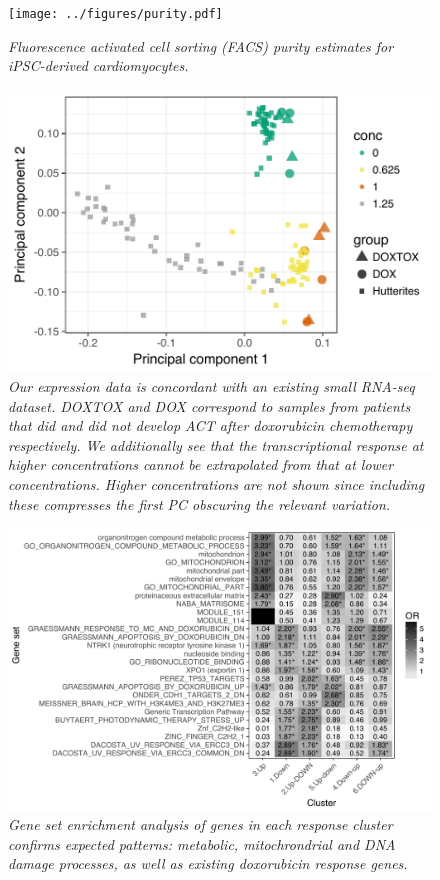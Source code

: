 \documentclass{article}
\begin{document}
\begin{figure}[h]
\begin{center}
    \texttt{[image: ../figures/purity.pdf]} 
    \caption{\it{Fluorescence activated cell sorting (FACS) purity estimates for iPSC-derived cardiomyocytes.}}
    \label{fig:purity}
    \end{center}
\end{figure}

\begin{figure}[h]
\begin{center}
    \includegraphics[width=.6\textwidth]{../figures/burridge_comparison.pdf} %
    \caption{\it{Our expression data is concordant with an existing small RNA-seq dataset\citep{Burridge2016}. DOXTOX and DOX correspond to samples from patients that did and did not develop ACT after doxorubicin chemotherapy respectively. We additionally see that the transcriptional response at higher concentrations cannot be extrapolated from that at lower concentrations. Higher concentrations are not shown since including these compresses the first PC obscuring the relevant variation.}}
    \label{fig:burridge}
    \end{center}
\end{figure}

\begin{figure}[h]
\begin{center}
    \includegraphics[width=1\textwidth]{../figures/cluster_go.pdf} %
    \caption{\it{Gene set enrichment analysis of genes in each response cluster confirms expected patterns: metabolic, mitochrondrial and DNA damage processes, as well as existing doxorubicin response genes.}}
    \label{fig:go}
    \end{center}
\end{figure}
\end{document}
